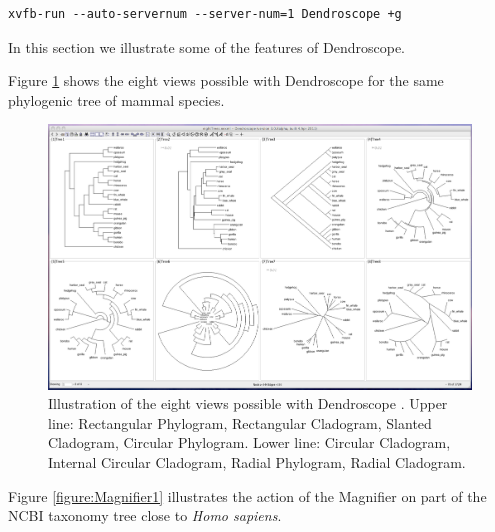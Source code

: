 \documentclass[11pt]{article}
\def\Dendroscope{{\sf Dendroscope }}
\begin{document}
\begin{verbatim}
xvfb-run --auto-servernum --server-num=1 Dendroscope +g
\end{verbatim}




In this section we illustrate some of the features of Dendroscope.


Figure \ref{figure:7views} shows 
the eight  views possible with \Dendroscope for the same phylogenic tree of mammal species. 

\begin{figure}[ht] %
\begin{center}

\includegraphics[width=1.0\textwidth]{./figs/eightTrees-2.pdf}
\end{center}
\caption{\small \sffamily Illustration of the eight views possible with \Dendroscope. Upper line: Rectangular Phylogram, Rectangular Cladogram, Slanted Cladogram, Circular Phylogram. Lower line: Circular Cladogram, Internal Circular Cladogram, Radial Phylogram, Radial Cladogram.}
\label{figure:7views}
\end{figure}


Figure  \ref{figure:Magnifier1} illustrates the action of the Magnifier on part of the NCBI taxonomy tree close to \textit{Homo sapiens}.
\end{document}
